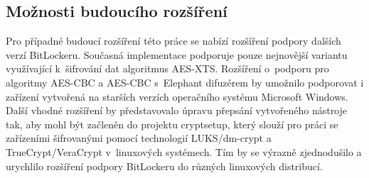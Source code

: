 \subsection*{Možnosti budoucího rozšíření}

Pro případné budoucí rozšíření této práce se nabízí rozšíření podpory dalších verzí BitLockeru. Současná implementace podporuje pouze nejnovější variantu využívající k~šifrování dat algoritmus AES-XTS. Rozšíření o~podporu pro algoritmy AES-CBC a AES-CBC s~Elephant difuzérem by umožnilo podporovat i zařízení vytvořená na starších verzích operačního systému Microsoft Windows. Další vhodné rozšíření by představovalo úpravu přepsání vytvořeného nástroje tak, aby mohl být začleněn do projektu cryptsetup, který slouží pro práci se zařízeními šifrovanými pomocí technologií LUKS/dm-crypt a TrueCrypt/VeraCrypt v~linuxových systémech. Tím by se výrazně zjednodušilo a urychlilo rozšíření podpory BitLockeru do různých linuxových distribucí.



